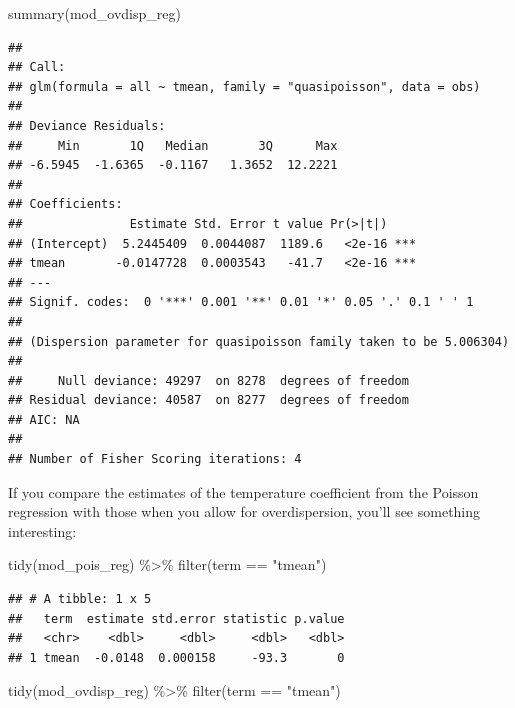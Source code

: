 \documentclass[
]{book}
\newenvironment{Shaded}{\begin{snugshade}}{\end{snugshade}}
\newcommand{\FunctionTok}[1]{\textcolor[rgb]{0.00,0.00,0.00}{#1}}
\newcommand{\NormalTok}[1]{#1}
\newcommand{\SpecialCharTok}[1]{\textcolor[rgb]{0.00,0.00,0.00}{#1}}
\newcommand{\StringTok}[1]{\textcolor[rgb]{0.31,0.60,0.02}{#1}}
\begin{document}
\begin{Shaded}
\begin{Highlighting}[]
\FunctionTok{summary}\NormalTok{(mod\_ovdisp\_reg)}
\end{Highlighting}
\end{Shaded}

\begin{verbatim}
## 
## Call:
## glm(formula = all ~ tmean, family = "quasipoisson", data = obs)
## 
## Deviance Residuals: 
##     Min       1Q   Median       3Q      Max  
## -6.5945  -1.6365  -0.1167   1.3652  12.2221  
## 
## Coefficients:
##               Estimate Std. Error t value Pr(>|t|)    
## (Intercept)  5.2445409  0.0044087  1189.6   <2e-16 ***
## tmean       -0.0147728  0.0003543   -41.7   <2e-16 ***
## ---
## Signif. codes:  0 '***' 0.001 '**' 0.01 '*' 0.05 '.' 0.1 ' ' 1
## 
## (Dispersion parameter for quasipoisson family taken to be 5.006304)
## 
##     Null deviance: 49297  on 8278  degrees of freedom
## Residual deviance: 40587  on 8277  degrees of freedom
## AIC: NA
## 
## Number of Fisher Scoring iterations: 4
\end{verbatim}

If you compare the estimates of the temperature coefficient from the Poisson
regression with those when you allow for overdispersion, you'll see something
interesting:

\begin{Shaded}
\begin{Highlighting}[]
\FunctionTok{tidy}\NormalTok{(mod\_pois\_reg) }\SpecialCharTok{\%\textgreater{}\%} 
  \FunctionTok{filter}\NormalTok{(term }\SpecialCharTok{==} \StringTok{"tmean"}\NormalTok{)}
\end{Highlighting}
\end{Shaded}

\begin{verbatim}
## # A tibble: 1 x 5
##   term  estimate std.error statistic p.value
##   <chr>    <dbl>     <dbl>     <dbl>   <dbl>
## 1 tmean  -0.0148  0.000158     -93.3       0
\end{verbatim}

\begin{Shaded}
\begin{Highlighting}[]
\FunctionTok{tidy}\NormalTok{(mod\_ovdisp\_reg) }\SpecialCharTok{\%\textgreater{}\%} 
  \FunctionTok{filter}\NormalTok{(term }\SpecialCharTok{==} \StringTok{"tmean"}\NormalTok{)}
\end{Highlighting}
\end{Shaded}
\end{document}
